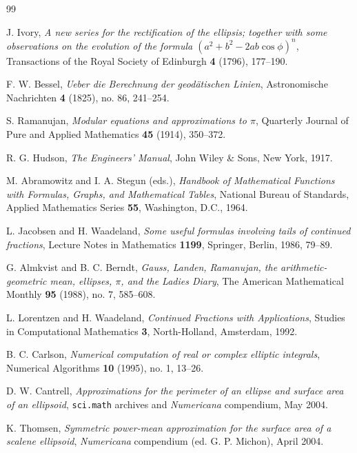 \documentclass[11pt,a4paper]{article}
\theoremstyle{spacious}
\theoremstyle{spaciousdef}
\begin{document}
\begin{thebibliography}{99}

J. Ivory, \emph{A new series for the rectification of the ellipsis; together with some observations on the evolution of the formula $(a^2 + b^2 - 2ab\cos\phi)^n$}, Transactions of the Royal Society of Edinburgh \textbf{4} (1796), 177--190.

F. W. Bessel, \emph{Ueber die Berechnung der geod\"atischen Linien}, Astronomische Nachrichten \textbf{4} (1825), no. 86, 241--254.

S. Ramanujan, \emph{Modular equations and approximations to $\pi$}, Quarterly Journal of Pure and Applied Mathematics \textbf{45} (1914), 350--372.

R. G. Hudson, \emph{The Engineers' Manual}, John Wiley \& Sons, New York, 1917.

M. Abramowitz and I. A. Stegun (eds.), \emph{Handbook of Mathematical Functions with Formulas, Graphs, and Mathematical Tables}, National Bureau of Standards, Applied Mathematics Series \textbf{55}, Washington, D.C., 1964.

L. Jacobsen and H. Waadeland, \emph{Some useful formulas involving tails of continued fractions}, Lecture Notes in Mathematics \textbf{1199}, Springer, Berlin, 1986, 79--89.

G. Almkvist and B. C. Berndt, \emph{Gauss, Landen, Ramanujan, the arithmetic-geometric mean, ellipses, $\pi$, and the Ladies Diary}, The American Mathematical Monthly \textbf{95} (1988), no. 7, 585--608.

L. Lorentzen and H. Waadeland, \emph{Continued Fractions with Applications}, Studies in Computational Mathematics \textbf{3}, North-Holland, Amsterdam, 1992.

B. C. Carlson, \emph{Numerical computation of real or complex elliptic integrals}, Numerical Algorithms \textbf{10} (1995), no. 1, 13--26.

D. W. Cantrell, \emph{Approximations for the perimeter of an ellipse and surface area of an ellipsoid}, \texttt{sci.math} archives and \emph{Numericana} compendium, May 2004.

K. Thomsen, \emph{Symmetric power-mean approximation for the surface area of a scalene ellipsoid}, \emph{Numericana} compendium (ed. G. P. Michon), April 2004.


\end{thebibliography}
\end{document}
